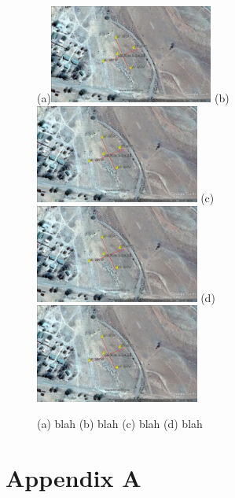 \documentclass[draft,linenumbers]{agujournal2018}
\begin{document}
\begin{figure}
  
  \subfigure(a){\includegraphics[width=0.48\textwidth]{figures/site.png}} 
  \subfigure(b){\includegraphics[width=0.48\textwidth]{figures/site.png}} 
  \subfigure(c){\includegraphics[width=0.48\textwidth]{figures/site.png}} 
  \subfigure(d){\includegraphics[width=0.48\textwidth]{figures/site.png}} 

  \caption{(a) blah (b) blah (c) blah (d) blah}
 
\label{fig:z}
\end{figure}

\clearpage

\section{Appendix A}
\end{document}
